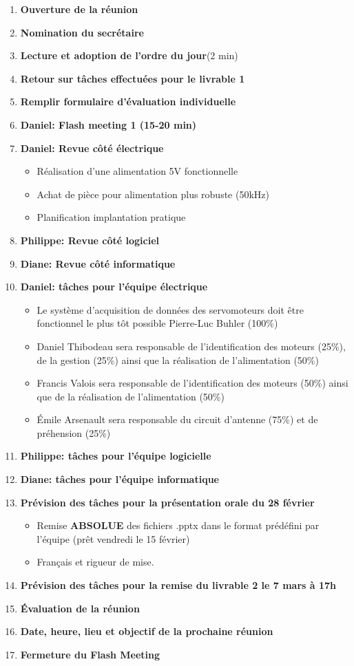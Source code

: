 \documentclass[12pt]{ULojpv}
\begin{document}
\entete
\begin{enumerate}
   \item \textbf{Ouverture de la réunion}
   \item \textbf{Nomination du secrétaire}
   \item \textbf{Lecture et adoption de l'ordre du jour}(2 min)
   \item \textbf{Retour sur tâches effectuées pour le livrable 1}
   \item \textbf{Remplir formulaire d'évaluation individuelle}
   \item \textbf{Daniel: Flash meeting 1 (15-20 min)} 
   \item \textbf{Daniel: Revue côté électrique}
   \begin{itemize}
   \item Réalisation d'une alimentation 5V fonctionnelle 
   \item Achat de pièce pour alimentation plus robuste (50kHz)
   \item Planification implantation pratique
   \end{itemize}
   \item \textbf{Philippe: Revue côté logiciel}
   \item \textbf{Diane: Revue côté informatique}
   \item \textbf{Daniel: tâches pour l'équipe électrique}
   \begin{itemize}
   \item Le système d'acquisition de données des servomoteurs doit être fonctionnel le plus tôt possible Pierre-Luc Buhler (100\%)
   \item Daniel Thibodeau sera responsable de l'identification des moteurs (25\%), de la gestion (25\%) ainsi que la réalisation de l'alimentation (50\%)
   \item Francis Valois sera responsable de l'identification des moteurs (50\%) ainsi que de la réalisation de l'alimentation (50\%)
   \item Émile Arsenault sera responsable du circuit d'antenne (75\%) et de préhension (25\%)
   \end{itemize}
   \item \textbf{Philippe: tâches pour l'équipe logicielle}
   \item \textbf{Diane: tâches pour l'équipe informatique}
      \item \textbf{Prévision des tâches  pour la présentation orale du 28 février}
   \begin{itemize}
   \item Remise \textbf{ABSOLUE} des fichiers .pptx dans le format prédéfini par l'équipe (prêt vendredi le 15 février)
   \item Français et rigueur de mise.
   \end{itemize}
   \item \textbf{Prévision des tâches pour la remise du livrable 2 le 7 mars à 17h}
   \item \textbf{Évaluation de la réunion}
   \item \textbf{Date, heure, lieu et objectif de la prochaine réunion}
   \item \textbf{Fermeture du Flash Meeting}
\end{enumerate}
\end{document}
